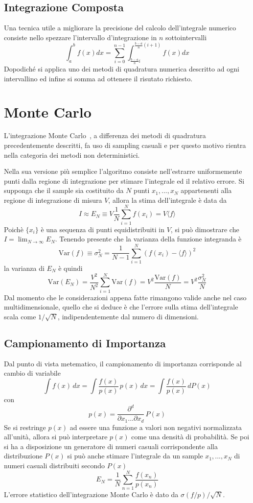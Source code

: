 \subsection{Integrazione Composta}
Una tecnica utile a migliorare la precisione del calcolo dell'integrale numerico consiste nello spezzare l'intervallo d'integrazione in $n$ sottointervalli
$$\int_a^b f(x)dx=\sum_{i=0}^{n-1}\int_{\frac{b-a}{n}i}^{\frac{b-a}{n}(i+1)}f(x)dx$$
Dopodiché si applica uno dei metodi di quadratura numerica descritto ad ogni intervallino ed infine si somma ad ottenere il risutato richiesto.

\section{Monte Carlo}
L'integrazione Monte Carlo~\cite{sei}, a differenza dei metodi di quadratura precedentemente descritti, fa uso di sampling casuali e per questo motivo rientra nella categoria dei metodi non deterministici.

Nella sua versione più semplice l'algoritmo consiste nell'estrarre uniformemente punti dalla regione di integrazione per stimare l'integrale ed il relativo errore. Si supponga che il sample sia costituito da $N$ punti $x_1,...,x_N$ appartenenti alla regione di integrazione di misura $V$, allora la stima dell'integrale è data da
$$ I \approx E_N \equiv V\frac{1}{N} \sum_{i=1}^N f(x_i) = V \langle f \rangle $$
Poichè $\{x_i\}$ è una sequenza di punti equidistribuiti in $V$, si può dimostrare che $ I = \lim_{N \to \infty} E_N $.
Tenendo presente che la varianza della funzione integranda è
$$ \mathrm{Var}(f)\equiv\sigma_N^2 = \frac{1}{N-1} \sum_{i=1}^N (f(x_i) - \langle f \rangle)^2$$
la varianza di $E_N$ è quindi
$$ \mathrm{Var}(E_N) =  \frac{V^2}{N^2} \sum_{i=1}^N \mathrm{Var}(f)  =V^2 \frac{\mathrm{Var}(f)}{N} = V^2\frac{\sigma_N^2}{N}$$
Dal momento che le considerazioni appena fatte rimangono valide anche nel caso multidimensionale, quello che si deduce è che l'errore sulla stima dell'integrale scala come $1/\sqrt{N}$, indipendentemente dal numero di dimensioni.

\subsection{Campionamento di Importanza}
Dal punto di vista metematico, il campionamento di importanza corrisponde al cambio di variabile
$$\int f(x) \,dx = \int\frac{f(x)}{p(x)}\,p(x)\,dx = \int\frac{f(x)}{p(x)}\,dP(x)$$
con $$p(x)=\frac{\partial^d}{\partial x_1...\partial x_d}\,P(x)$$
Se si restringe $p(x)$ ad essere una funzione a valori non negativi normalizzata all'unità, allora si può interpretare $p(x)$ come una densità di probabilità. Se poi si ha a disposizione un generatore di numeri casuali corrispondente alla distribuzione $P(x)$ si può anche stimare l'integrale da un sample $x_1,...,x_N$ di numeri casuali distribuiti secondo $P(x)$
$$E_N = \frac{1}{N}\sum_{n=1}^N\frac{f(x_n)}{p(x_n)}$$
L'errore statistico dell'integrazione Monte Carlo è dato da $\sigma(f/p)/\sqrt N$.

